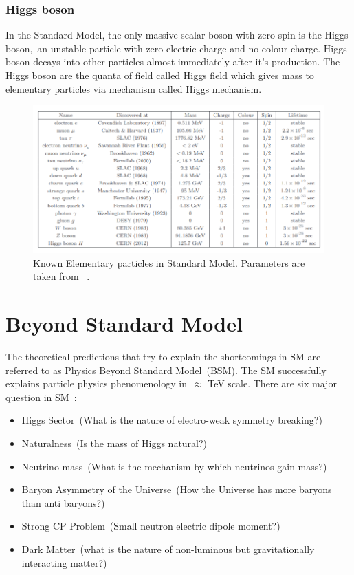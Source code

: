 \subsubsection{Higgs boson}
In the Standard Model, the only massive scalar boson with zero spin is the Higgs boson,~an unstable particle with zero electric charge and no colour charge. Higgs boson decays into other particles almost immediately after it's production. The Higgs boson are the quanta of field called Higgs field which gives mass to elementary particles via mechanism called Higgs mechanism.
\begin{figure}
\centering
\includegraphics[scale=0.4]{chapter1/particle-sm.png}
\caption{Known Elementary particles in Standard Model. Parameters are taken from ~\cite{ParticleDataGroup:2016lqr}.}
\end{figure}
\section{Beyond Standard Model}
The theoretical predictions that try to explain the shortcomings in SM are referred to as Physics Beyond Standard Model~(BSM). The SM successfully explains particle physics phenomenology in~$\approx$ TeV scale. There are six major question in SM~\cite{Clarke:2016vnr}:
\begin{itemize}
\item Higgs Sector~(What is the nature of electro-weak symmetry breaking?)
\item Naturalness~(Is the mass of Higgs natural?)
\item Neutrino mass~(What is the mechanism by which neutrinos gain mass?)
\item Baryon Asymmetry of the Universe~(How the Universe has more baryons than anti baryons?)
\item Strong CP Problem~(Small neutron electric dipole moment?)
\item Dark Matter~(what is the nature of non-luminous but gravitationally interacting matter?)
\end{itemize}
